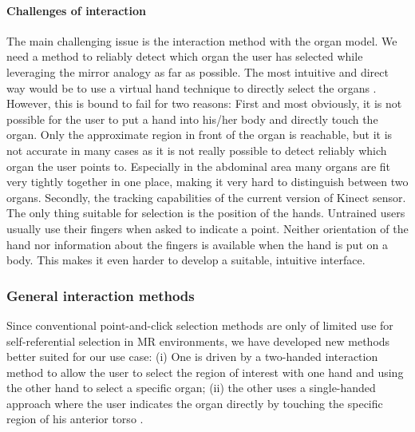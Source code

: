 \paragraph{Challenges of interaction}
The main challenging issue is the interaction method with the organ model. We need a method to reliably detect which organ the user has selected while leveraging the mirror analogy as far as possible. The most intuitive and direct way would be to use a virtual hand technique to directly select the organs \cite{Ha2010a}. However, this is bound to fail for two reasons:
First and most obviously, it is not possible for the user to put a hand into his/her body and directly touch the organ. Only the approximate region in front of the organ is reachable, but it is not accurate in many cases as it is not really possible to detect reliably which organ the user points to. 
Especially in the abdominal area many organs are fit very tightly together in one place, making it very hard to distinguish between two organs.
Secondly, the tracking capabilities of the current version of Kinect sensor. The only thing suitable for selection is the position of the hands. 
Untrained users usually use their fingers when asked to indicate a point.
Neither orientation of the hand nor information about the fingers is available when the hand is put on a body. 
This makes it even harder to develop a suitable, intuitive interface. 

\subsubsection{General interaction methods}
Since conventional point-and-click selection methods are only of limited use for self-referential selection in MR environments, we have developed new methods better suited for our use case: (i) One is driven by a two-handed interaction method to allow the user to select the region of interest with one hand and using the other hand to select a specific organ; (ii) the other uses a single-handed approach where the user indicates the organ directly by touching the specific region of his anterior torso \cite{weiss2013}. 

